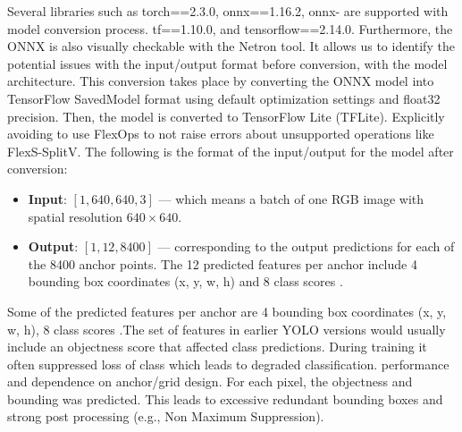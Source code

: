 \documentclass[a4paper,13pt]{report}
\begin{document}
Several libraries such as torch==2.3.0, onnx==1.16.2, onnx- are supported with model conversion process. tf==1.10.0, and tensorflow==2.14.0. Furthermore, the ONNX is also visually checkable with the Netron tool. It allows us to identify the potential issues with the input/output format before conversion, with the model architecture. This conversion takes place by converting the ONNX model into TensorFlow SavedModel format using default optimization settings and float32 precision. Then, the model is converted to TensorFlow Lite (TFLite). Explicitly avoiding to use FlexOps to not raise errors about unsupported operations like FlexS-SplitV. 
The following is the format of the input/output for the model after conversion:

\begin{itemize}
  \item \textbf{Input}: $[1, 640, 640, 3]$ --- which means a batch of one RGB image with spatial resolution $640\times640$.
  \item \textbf{Output}: $[1, 12, 8400]$ --- corresponding to the output predictions for each of the 8400 anchor points. The 12 predicted features per anchor include 4 bounding box coordinates (x, y, w, h) and 8 class scores \cite{yoloobjectfeatures}.
\end{itemize}

Some of the predicted features per anchor are 4 bounding box coordinates (x, y, w, h), 8 class scores \cite{18}.The set of features in earlier YOLO versions would usually include an objectness score that affected class predictions. During training it often suppressed loss of class which leads to degraded classification.
performance and dependence on anchor/grid design. For each pixel, the objectness and bounding was predicted. This leads to excessive redundant bounding boxes and strong post processing (e.g., Non Maximum
Suppression).


\FloatBarrier
\end{document}
